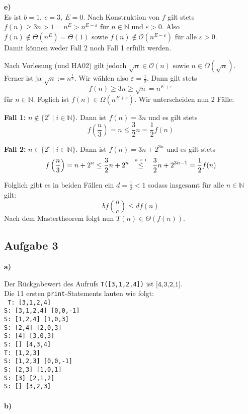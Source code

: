 \documentclass[a4paper,graphics,11pt]{article}
\newcommand{\aufgabe}[1]{\subsection*{Aufgabe #1}}
\newcommand{\up}[2]{\mathrel{\overset{\makebox[0pt]{\mbox{\normalfont\tiny #2}}}{#1}}}
\begin{document}
\textbf{e)}\\
Es ist $b = 1,\ c = 3,\ E = 0$.
Nach Konstruktion von $f$ gilt stets $f(n) \geq 3n > 1 = n^{E} > n^{E-\varepsilon}$ für $n \in \mathbb{N}$ und
$\varepsilon > 0$. Also $f(n) \notin \Theta(n^E) = \Theta(1)$ sowie $f(n) \notin \mathcal{O}(n^{E - \varepsilon})$ für alle $\varepsilon > 0$.\\
Damit können weder Fall 2 noch Fall 1 erfüllt werden.

Nach Vorlesung (und HA02) gilt jedoch $\sqrt{n} \in \mathcal{O}(n)$ sowie $n \in \Omega(\sqrt{n})$.
Ferner ist ja $\sqrt{n} := n^{\frac{1}{2}}$. Wir wählen also $\varepsilon = \frac{1}{2}$.
Dann gilt stets
$$
    f(n) \geq 3n \geq \sqrt{n} = n^{E+\varepsilon}
$$
für $n \in \mathbb{N}$.
Foglich ist $f(n) \in \Omega(n^{E+\varepsilon})$. Wir unterscheiden nun 2 Fälle:

\textbf{Fall 1:} $n \notin \{2^i \mid i \in \mathbb{N}\}$. Dann ist $f(n) = 3n$ und es gilt stets
$$
    f\left(\frac{n}{3}\right) = n \leq \frac{3}{2} n = \frac{1}{2} f(n)
$$

\textbf{Fall 2:} $n \in \{2^i \mid i\in \mathbb{N} \}$. Dann ist $f(n) = 3n + 2^{3n}$ und es gilt stets
$$
    f\left(\frac{n}{3}\right) = n+2^n
    \leq \frac{3}{2}n + 2^{n}
    \quad\up{\leq}{$n \geq 1$}\quad \frac{3}{2}n + 2^{3n - 1}
    = \frac{1}{2} f(n)
$$

Folglich gibt es in beiden Fällen ein $d = \frac{1}{2} < 1$ sodass insgesamt für alle $n \in \mathbb{N}$ gilt:
$$
    bf\left(\frac{n}{c}\right) \leq d f(n)
$$
Nach dem Mastertheorem folgt nun $T(n) \in \Theta(f(n))$.

\aufgabe{3}
\textbf{a)}

Der Rückgabewert des Aufrufs \texttt{T([3,1,2,4])} ist $\texttt{[4,3,2,1]}$.\\
Die 11 ersten \texttt{print}-Statements lauten wie folgt:\\
\texttt{
    T: [3,1,2,4] \\
    S: [3,1,2,4] [0,0,-1]\\
    S: [1,2,4] [1,0,3]\\
    S: [2,4] [2,0,3]\\
    S: [4] [3,0,3]\\
    S: [] [4,3,4]\\
    T: [1,2,3]\\
    S: [1,2,3] [0,0,-1]\\
    S: [2,3] [1,0,1]\\
    S: [3] [2,1,2]\\
    S: [] [3,2,3]\\
}\\
\textbf{b)}
\end{document}
